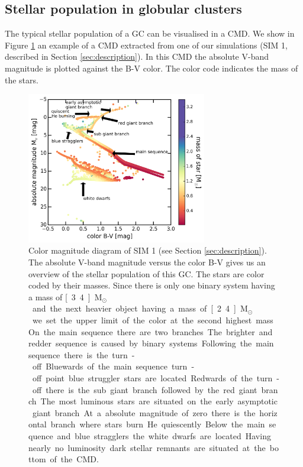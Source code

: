 \subsection{Stellar population in globular clusters}\label{sec:cmd_theory}
The typical stellar population of a \ac{GC} can be visualised in a \ac{CMD}. We show in Figure \ref{fig:cmd} an example of a \ac{CMD} extracted from one of our simulations (SIM 1, described in Section \ref{sec:description}). In this \ac{CMD} the absolute V-band magnitude is plotted against the B-V color. The color code indicates the mass of the stars. 
\begin{figure}[htbp]
\centering
	\includegraphics[width=0.7\textwidth]{Plots/color_magnitude_diagram.png}
	\caption{Color magnitude diagram of SIM 1 (see Section \ref{sec:description}). The absolute V-band magnitude versus the color B-V gives us an overview of the stellar population of this \ac{GC}. The stars are color coded by their masses. Since there is only one binary system having a mass of \unit[3.4]{M$_\odot$} and the next heavier object having a mass of \unit[2.4]{M$_\odot$} we set the upper limit of the color at the second highest mass. On the main sequence there are two branches. The brighter and redder sequence is caused by binary systems. Following the main sequence there is the turn-off. Bluewards of the main sequence turn-off point blue struggler stars are located. Redwards of the turn-off there is the sub giant branch followed by the red giant branch. The most luminous stars are situated on the early asymptotic giant branch. At a absolute magnitude of zero there is the horizontal branch where stars burn He quiescently. Below  the main sequence and blue stragglers the white dwarfs are located. Having nearly no luminosity dark stellar remnants are situated at the bottom of the \ac{CMD}.}
	\label{fig:cmd}
\end{figure}
